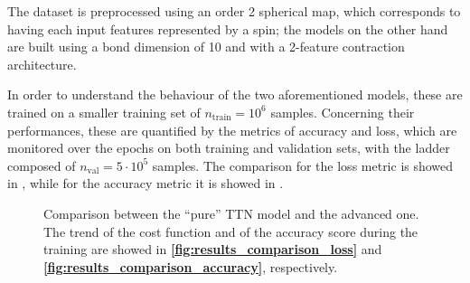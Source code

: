 \documentclass[../main/main.tex]{subfiles}
\begin{document}
The dataset is preprocessed using an order 2 spherical map, which corresponds 
to having each input features represented by a spin; the models on the other hand are built using a bond dimension of 10 and with a 2-feature contraction architecture.

In order to understand the behaviour of the two aforementioned models, these are trained on a smaller training set of \( n_{\mathrm{train}} = 10^{6} \) samples. Concerning their performances, these are quantified by the metrics of accuracy and loss, which are monitored over the epochs on both training and validation sets, with the ladder composed of \( n_{\mathrm{val}} = 5 \cdot 10^{5} \) samples. The comparison for the loss metric is showed in , while for the accuracy metric it is showed in .

\begin{figure}[!h]
    \begin{minipage}[c]{0.50\linewidth}
        \vspace{0pt}
        \centering
    \end{minipage}%
    \begin{minipage}[c]{0.50\linewidth}
        \vspace{0pt}
        \centering
    \end{minipage}%
    \caption{Comparison between the ``pure'' TTN model and the advanced one. The trend of the cost function and of the accuracy score during the training are showed in \textbf{\ref{fig:results_comparison_loss}} and \textbf{\ref{fig:results_comparison_accuracy}}, respectively.}
    \label{fig:results_comparison}
\end{figure}
\end{document}
